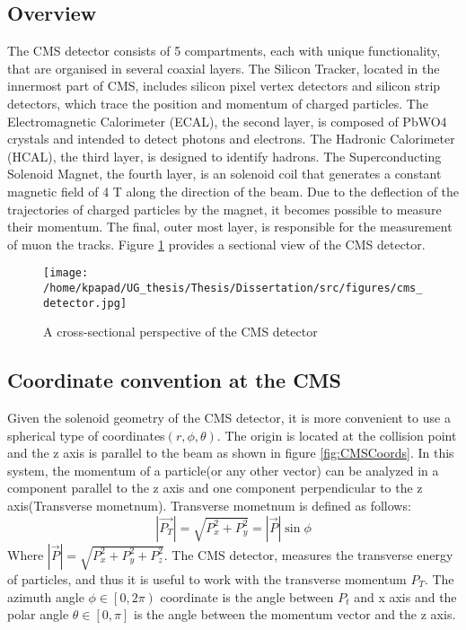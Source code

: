 \subsection{Overview}
\label{sec:org3cfeb42}
The CMS detector consists of 5 compartments, each with unique functionality, that are organised in several coaxial layers. The Silicon Tracker, located in the innermost part of CMS, includes silicon pixel vertex detectors and silicon strip detectors, which trace the position and momentum of charged particles. The Electromagnetic Calorimeter (ECAL), the second layer, is composed of PbWO4 crystals and intended to detect photons and electrons. The Hadronic Calorimeter (HCAL), the third layer, is designed to identify hadrons. The Superconducting Solenoid Magnet, the fourth layer, is an solenoid coil that generates a constant magnetic field of 4 T along the direction of the  beam. Due to the deflection of the trajectories of charged particles by the magnet, it becomes possible to measure their momentum. The final, outer most layer, is responsible for the measurement of muon the tracks. Figure \ref{fig:CMS_detector}\cite{CMSDetecorOverview} provides a sectional view of the CMS detector.
\begin{figure}[h]
\centering
\texttt{[image: /home/kpapad/UG\_thesis/Thesis/Dissertation/src/figures/cms\_detector.jpg]}
\caption{A cross-sectional perspective of the CMS detector}
\label{fig:CMS_detector}
\end{figure}

\subsection{Coordinate convention at the CMS}
\label{sec:orge8fa37a}
Given the solenoid geometry of the CMS detector, it is more convenient to use a spherical type of coordinates\(\left(r, \phi, \theta \right)\). The origin is located at the collision point and the z axis is parallel to the beam as shown in figure \ref{fig:CMSCoords}. In this system, the momentum of a particle(or any other vector) can be analyzed in a component parallel to the z axis and one component perpendicular to the z axis(Transverse mometnum). Transverse mometnum is defined as follows:
\begin{equation}
|\vec{P_{T}}| = \sqrt{P_{x}^{2} + P_{y}^{2}} = |\vec{P}|\sin{\phi}
\end{equation}
Where \(|\vec{P}| = \sqrt{P_{x}^{2} + P_{y}^{2} + P_{z}^{2}}\). The CMS detector, measures the transverse energy\cite{MomentumCMS} of particles, and thus it is useful to work with the transverse momentum \(P_{T}\). The azimuth angle  \(\phi \in \left[0, 2\pi\right)\) coordinate is the angle between \(P_{t}\) and x axis and the polar angle  \(\theta \in \left[0, \pi   \right]\) is the angle between the momentum vector and the z axis.


